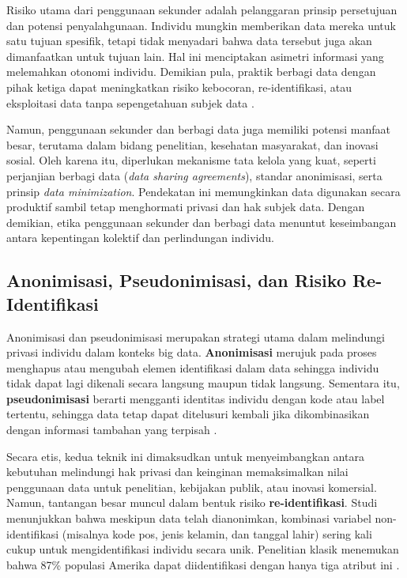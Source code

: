 Risiko utama dari penggunaan sekunder adalah pelanggaran prinsip persetujuan dan potensi penyalahgunaan. Individu mungkin memberikan data mereka untuk satu tujuan spesifik, tetapi tidak menyadari bahwa data tersebut juga akan dimanfaatkan untuk tujuan lain. Hal ini menciptakan asimetri informasi yang melemahkan otonomi individu. Demikian pula, praktik berbagi data dengan pihak ketiga dapat meningkatkan risiko kebocoran, re-identifikasi, atau eksploitasi data tanpa sepengetahuan subjek data \cite{ohm2010broken}.  

Namun, penggunaan sekunder dan berbagi data juga memiliki potensi manfaat besar, terutama dalam bidang penelitian, kesehatan masyarakat, dan inovasi sosial. Oleh karena itu, diperlukan mekanisme tata kelola yang kuat, seperti perjanjian berbagi data (\textit{data sharing agreements}), standar anonimisasi, serta prinsip \textit{data minimization}. Pendekatan ini memungkinkan data digunakan secara produktif sambil tetap menghormati privasi dan hak subjek data. Dengan demikian, etika penggunaan sekunder dan berbagi data menuntut keseimbangan antara kepentingan kolektif dan perlindungan individu.

\subsection{Anonimisasi, Pseudonimisasi, dan Risiko Re-Identifikasi}

Anonimisasi dan pseudonimisasi merupakan strategi utama dalam melindungi privasi individu dalam konteks big data. \textbf{Anonimisasi} merujuk pada proses menghapus atau mengubah elemen identifikasi dalam data sehingga individu tidak dapat lagi dikenali secara langsung maupun tidak langsung. Sementara itu, \textbf{pseudonimisasi} berarti mengganti identitas individu dengan kode atau label tertentu, sehingga data tetap dapat ditelusuri kembali jika dikombinasikan dengan informasi tambahan yang terpisah \cite{sweeney2002k}.  

Secara etis, kedua teknik ini dimaksudkan untuk menyeimbangkan antara kebutuhan melindungi hak privasi dan keinginan memaksimalkan nilai penggunaan data untuk penelitian, kebijakan publik, atau inovasi komersial. Namun, tantangan besar muncul dalam bentuk risiko \textbf{re-identifikasi}. Studi menunjukkan bahwa meskipun data telah dianonimkan, kombinasi variabel non-identifikasi (misalnya kode pos, jenis kelamin, dan tanggal lahir) sering kali cukup untuk mengidentifikasi individu secara unik. Penelitian klasik menemukan bahwa 87\% populasi Amerika dapat diidentifikasi dengan hanya tiga atribut ini \cite{sweeney2000uniqueness}.  

